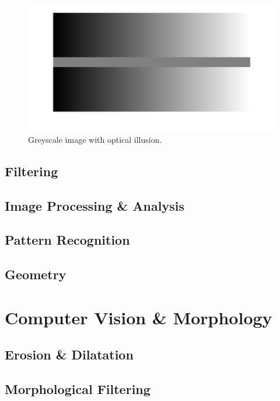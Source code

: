 \begin{figure}[!h]
	\centering
		\includegraphics[width=\textwidth]{images/greyillusion.png}
		\caption{Greyscale image with optical illusion.}
		\label{fig:greyillusion}
\end{figure}


\subsection{Filtering}

\subsection{Image Processing \& Analysis}

\subsection{Pattern Recognition}

\subsection{Geometry}


\section{Computer Vision \& Morphology}

\subsection{Erosion \& Dilatation}

\subsection{Morphological Filtering}

